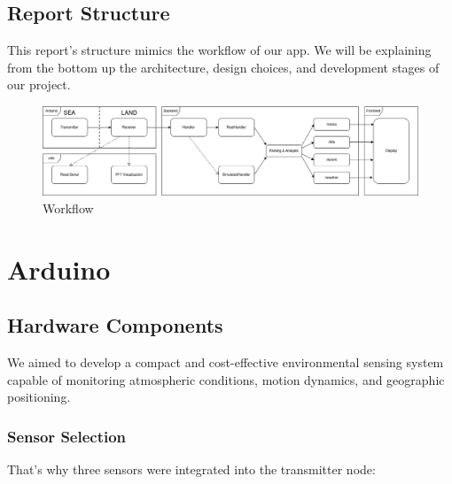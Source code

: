 \documentclass{article}
\begin{document}
    \subsection{Report Structure}
    This report's structure mimics the workflow of our app. We will be explaining from the bottom up the architecture, design choices, and development stages of our project.

    \begin{figure} [h]
        \centering
        \includegraphics[width=1\linewidth]{assets/workflow.png}
        \caption{Workflow}
        \label{fig:enter-label}
    \end{figure}
    
\section{Arduino}
\subsection{Hardware Components}
We aimed to develop a compact and cost-effective environmental sensing system capable of monitoring atmospheric conditions, motion dynamics, and geographic positioning. 
\subsubsection{Sensor Selection}
That's why three sensors were integrated into the transmitter node:
\end{document}
